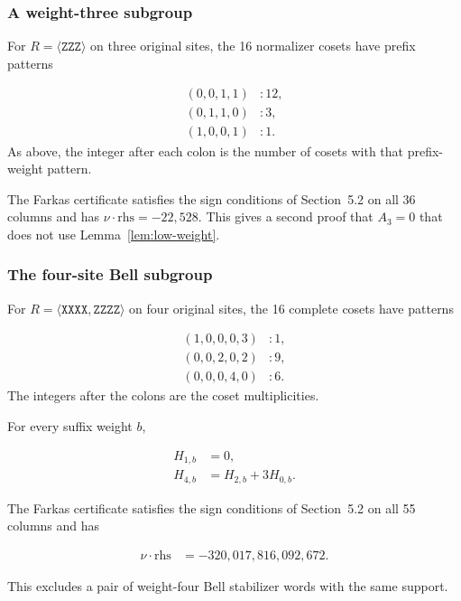 \documentclass[11pt]{article}
\newcommand{\rhs}{\mathrm{rhs}}
\begin{document}
\subsubsection{A weight-three subgroup}\label{a-weight-three-subgroup}

For \(R=\langle \mathtt{ZZZ} \rangle\) on three original sites, the 16 normalizer cosets have prefix patterns

\[
\begin{aligned}
(0,0,1,1)&:12, \\
(0,1,1,0)&:3, \\
(1,0,0,1)&:1.
\end{aligned}
\]
As above, the integer after each colon is the number of cosets with that prefix-weight pattern.

The Farkas certificate satisfies the sign conditions of Section~5.2 on all 36 columns and has \(\nu \cdot \rhs=-22{,}528\). This gives a second proof that \(A_3=0\) that does not use Lemma~\ref{lem:low-weight}.

\subsubsection{The four-site Bell subgroup}\label{the-four-site-bell-subgroup}

For \(R=\langle \mathtt{XXXX},\mathtt{ZZZZ} \rangle\) on four original sites, the 16 complete cosets have patterns

\[
\begin{aligned}
(1,0,0,0,3)&:1, \\
(0,0,2,0,2)&:9, \\
(0,0,0,4,0)&:6.
\end{aligned}
\]
The integers after the colons are the coset multiplicities.

For every suffix weight \(b\),

\[
\begin{aligned}
H_{1,b}&=0, \\
H_{4,b}&=H_{2,b}+3H_{0,b}.
\end{aligned}
\]

The Farkas certificate satisfies the sign conditions of Section~5.2 on all 55 columns and has

\[
\begin{aligned}
\nu \cdot \rhs &=-320{,}017{,}816{,}092{,}672.
\end{aligned}
\]

This excludes a pair of weight-four Bell stabilizer words with the same support.
\end{document}
